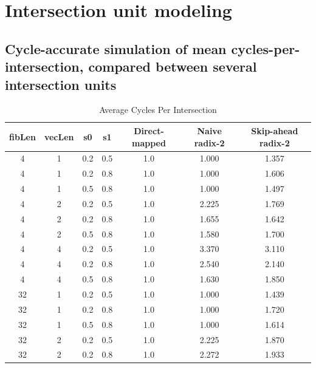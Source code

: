 \chapter{Intersection unit modeling}
\label{appendix:app_intersection_modeling}

\section{Cycle-accurate simulation of mean cycles-per-intersection, compared between several intersection units}

\begin{table}
\centering
\caption{Average Cycles Per Intersection}
\begin{tabular}{|c|c|c|c|c|c|c|}
\toprule
 fibLen &  vecLen &  s0 &  s1 &  Direct-mapped &  Naive radix-2 &  Skip-ahead radix-2 \\
\midrule
      4 &       1 & 0.2 & 0.5 &            1.0 &          1.000 &               1.357 \\
      4 &       1 & 0.2 & 0.8 &            1.0 &          1.000 &               1.606 \\
      4 &       1 & 0.5 & 0.8 &            1.0 &          1.000 &               1.497 \\
      4 &       2 & 0.2 & 0.5 &            1.0 &          2.225 &               1.769 \\
      4 &       2 & 0.2 & 0.8 &            1.0 &          1.655 &               1.642 \\
      4 &       2 & 0.5 & 0.8 &            1.0 &          1.580 &               1.700 \\
      4 &       4 & 0.2 & 0.5 &            1.0 &          3.370 &               3.110 \\
      4 &       4 & 0.2 & 0.8 &            1.0 &          2.540 &               2.140 \\
      4 &       4 & 0.5 & 0.8 &            1.0 &          1.630 &               1.850 \\
     32 &       1 & 0.2 & 0.5 &            1.0 &          1.000 &               1.439 \\
     32 &       1 & 0.2 & 0.8 &            1.0 &          1.000 &               1.720 \\
     32 &       1 & 0.5 & 0.8 &            1.0 &          1.000 &               1.614 \\
     32 &       2 & 0.2 & 0.5 &            1.0 &          2.225 &               1.870 \\
     32 &       2 & 0.2 & 0.8 &            1.0 &          2.272 &               1.933 \\

\end{tabular}
\end{table}
